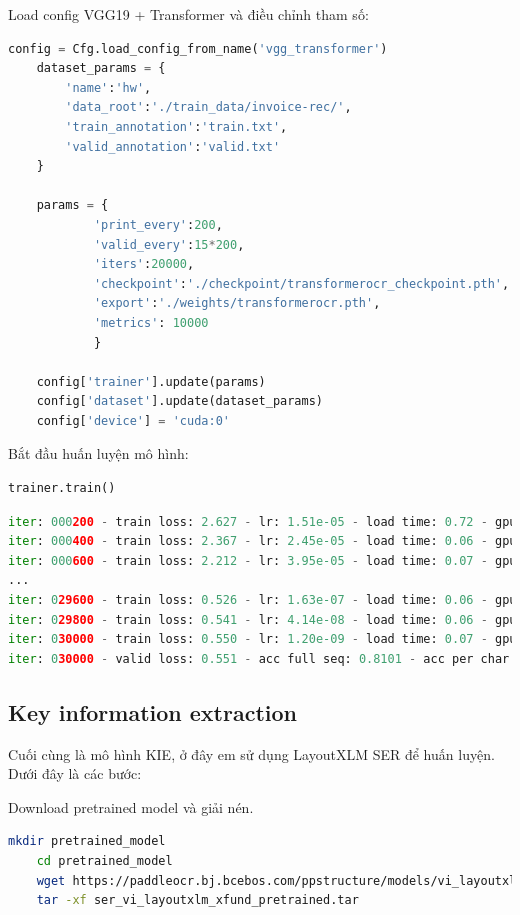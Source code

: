 Load config VGG19 + Transformer và điều chỉnh tham số:
\begin{lstlisting}[language=Python]
    config = Cfg.load_config_from_name('vgg_transformer')
    dataset_params = {
        'name':'hw',
        'data_root':'./train_data/invoice-rec/',
        'train_annotation':'train.txt',
        'valid_annotation':'valid.txt'
    }

    params = {
            'print_every':200,
            'valid_every':15*200,
            'iters':20000,
            'checkpoint':'./checkpoint/transformerocr_checkpoint.pth',    
            'export':'./weights/transformerocr.pth',
            'metrics': 10000
            }

    config['trainer'].update(params)
    config['dataset'].update(dataset_params)
    config['device'] = 'cuda:0'
\end{lstlisting}

Bắt đầu huấn luyện mô hình:
\begin{lstlisting}[language=Python]
    trainer.train()
\end{lstlisting}

\begin{lstlisting}[language=Python]
iter: 000200 - train loss: 2.627 - lr: 1.51e-05 - load time: 0.72 - gpu time: 97.80
iter: 000400 - train loss: 2.367 - lr: 2.45e-05 - load time: 0.06 - gpu time: 91.02
iter: 000600 - train loss: 2.212 - lr: 3.95e-05 - load time: 0.07 - gpu time: 93.54
...
iter: 029600 - train loss: 0.526 - lr: 1.63e-07 - load time: 0.06 - gpu time: 84.60
iter: 029800 - train loss: 0.541 - lr: 4.14e-08 - load time: 0.06 - gpu time: 90.35
iter: 030000 - train loss: 0.550 - lr: 1.20e-09 - load time: 0.07 - gpu time: 90.14
iter: 030000 - valid loss: 0.551 - acc full seq: 0.8101 - acc per char: 0.9543
\end{lstlisting}

\subsection{Key information extraction} \label{training-kie}
Cuối cùng là mô hình KIE, ở đây em sử dụng LayoutXLM SER để huấn luyện. Dưới đây là các bước:

Download pretrained model và giải nén.
\begin{lstlisting}[language=bash]
    mkdir pretrained_model
    cd pretrained_model
    wget https://paddleocr.bj.bcebos.com/ppstructure/models/vi_layoutxlm/ser_vi_layoutxlm_xfund_pretrained.tar
    tar -xf ser_vi_layoutxlm_xfund_pretrained.tar
\end{lstlisting}

